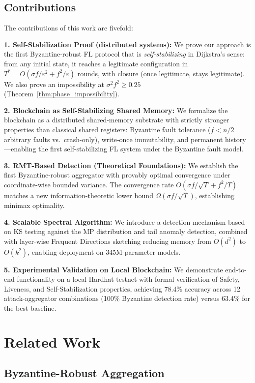 \documentclass[runningheads]{llncs}
\begin{document}
\subsection{Contributions}

The contributions of this work are fivefold:

\textbf{1. Self-Stabilization Proof (distributed systems):} We prove our approach is the first Byzantine-robust FL protocol that is \emph{self-stabilizing} in Dijkstra's sense: from any initial state, it reaches a legitimate configuration in $T^* = O(\sigma f/\varepsilon^2 + f^2/\varepsilon)$ rounds, with closure (once legitimate, stays legitimate). We also prove an impossibility at $\sigma^2 f^2 \geq 0.25$ (Theorem~\ref{thm:phase_impossibility}).

\textbf{2. Blockchain as Self-Stabilizing Shared Memory:} We formalize the blockchain as a distributed shared-memory substrate with strictly stronger properties than classical shared registers: Byzantine fault tolerance ($f < n/2$ arbitrary faults vs.\ crash-only), write-once immutability, and permanent history---enabling the first self-stabilizing FL system under the Byzantine fault model.

\textbf{3. RMT-Based Detection (Theoretical Foundations):} We establish the first Byzantine-robust aggregator with provably optimal convergence under coordinate-wise bounded variance. The convergence rate $O(\sigma f/\sqrt{T} + f^2/T)$ matches a new information-theoretic lower bound $\Omega(\sigma f/\sqrt{T})$, establishing minimax optimality.

\textbf{4. Scalable Spectral Algorithm:} We introduce a detection mechanism based on KS testing against the MP distribution and tail anomaly detection, combined with layer-wise Frequent Directions sketching reducing memory from $O(d^2)$ to $O(k^2)$, enabling deployment on 345M-parameter models.

\textbf{5. Experimental Validation on Local Blockchain:} We demonstrate end-to-end functionality on a local Hardhat testnet with formal verification of Safety, Liveness, and Self-Stabilization properties, achieving 78.4\% accuracy across 12 attack-aggregator combinations (100\% Byzantine detection rate) versus 63.4\% for the best baseline.

\section{Related Work}

\subsection{Byzantine-Robust Aggregation}
\end{document}
